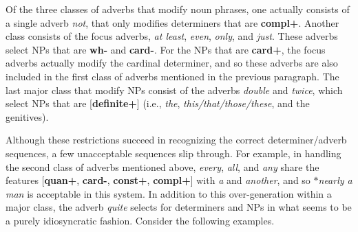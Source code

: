 Of the three classes of adverbs that modify noun phrases, one actually consists 
of a single adverb {\it not}, that only modifies determiners that are {\bf compl+}.  Another class consists of the focus adverbs, {\it at least}, {\it even}, {\it only}, and {\it just}.  These adverbs select NPs that are {\bf wh-} 
and {\bf card-}.  For the NPs that are {\bf card+}, the focus adverbs actually 
modify the cardinal determiner, and so these adverbs are also included in the 
first class of adverbs mentioned in the previous paragraph.  The last major 
class that modify NPs consist of the adverbs {\it double} and {\it twice}, 
which select NPs that are [{\bf definite+}] (i.e., {\it the}, {\it this/that/those/these}, and the genitives). 
 
Although these restrictions succeed in recognizing the correct 
determiner/adverb sequences, a few unacceptable sequences slip through.  For 
example, in handling the second class of adverbs mentioned above, {\it every}, 
{\it all}, and {\it any} share the features [{\bf quan+}, {\bf card-}, {\bf const+}, {\bf compl+}] with {\it a} and {\it another}, and so {\it $\ast$nearly a man} is acceptable in this system.  In addition to this 
over-generation within a major class, the adverb {\it quite} selects for 
determiners and NPs in what seems to be a purely idiosyncratic fashion. 
Consider the following examples. 
 
\beginsentences
{} 
\endsentences

